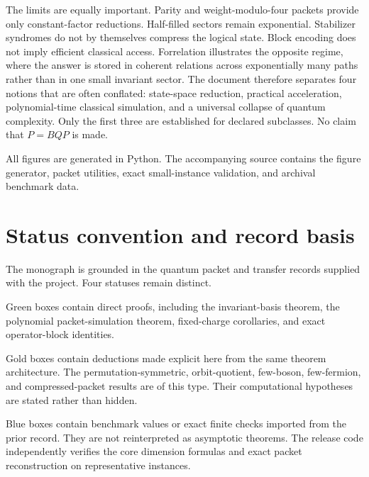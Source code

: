 The limits are equally important. Parity and weight-modulo-four packets provide only constant-factor reductions. Half-filled sectors remain exponential. Stabilizer syndromes do not by themselves compress the logical state. Block encoding does not imply efficient classical access. Forrelation illustrates the opposite regime, where the answer is stored in coherent relations across exponentially many paths rather than in one small invariant sector. The document therefore separates four notions that are often conflated: state-space reduction, practical acceleration, polynomial-time classical simulation, and a universal collapse of quantum complexity. Only the first three are established for declared subclasses. No claim that $P=BQP$ is made.

All figures are generated in Python. The accompanying source contains the figure generator, packet utilities, exact small-instance validation, and archival benchmark data.

\chapter*{Status convention and record basis}
The monograph is grounded in the quantum packet and transfer records supplied with the project. Four statuses remain distinct.

\begin{provedbox}
Green boxes contain direct proofs, including the invariant-basis theorem, the polynomial packet-simulation theorem, fixed-charge corollaries, and exact operator-block identities.
\end{provedbox}

\begin{derivedbox}
Gold boxes contain deductions made explicit here from the same theorem architecture. The permutation-symmetric, orbit-quotient, few-boson, few-fermion, and compressed-packet results are of this type. Their computational hypotheses are stated rather than hidden.
\end{derivedbox}

\begin{recordbox}
Blue boxes contain benchmark values or exact finite checks imported from the prior record. They are not reinterpreted as asymptotic theorems. The release code independently verifies the core dimension formulas and exact packet reconstruction on representative instances.
\end{recordbox}


